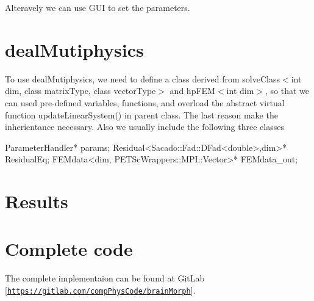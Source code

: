  Alteravely we can use G\+UI to set the parameters. \hypertarget{_intercalation_lib}{}\section{deal\+Mutiphysics}\label{_intercalation_lib}
To use deal\+Mutiphysics, we need to define a class derived from {\ttfamily solve\+Class$<$int dim, class matrix\+Type, class vector\+Type$>$} and {\ttfamily hp\+F\+E\+M$<$int dim$>$}, so that we can used pre-\/defined variables, functions, and overload the abstract virtual function {\ttfamily update\+Linear\+System()} in parent class. The last reason make the inherientance necessary. Also we usually include the following three classes 
\begin{DoxyCode}
ParameterHandler* params;   
Residual<Sacado::Fad::DFad<double>,dim>* ResidualEq;
FEMdata<dim, PETScWrappers::MPI::Vector>* FEMdata\_out;
\end{DoxyCode}
 \hypertarget{_intercalation_results}{}\section{Results}\label{_intercalation_results}
    \hypertarget{_intercalation_com}{}\section{Complete code}\label{_intercalation_com}
The complete implementaion can be found at Git\+Lab \mbox{[}\href{https://gitlab.com/compPhysCode/brainMorph}{\tt https\+://gitlab.\+com/comp\+Phys\+Code/brain\+Morph}\mbox{]}. 
